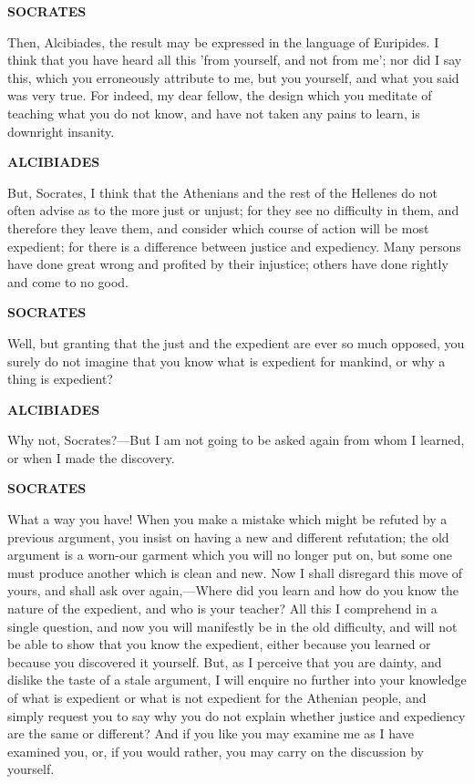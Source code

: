 \documentclass[11pt,letter]{article}
\begin{document}
\par \textbf{SOCRATES}
\par   Then, Alcibiades, the result may be expressed in the language of Euripides. I think that you have heard all this 'from yourself, and not from me'; nor did I say this, which you erroneously attribute to me, but you yourself, and what you said was very true. For indeed, my dear fellow, the design which you meditate of teaching what you do not know, and have not taken any pains to learn, is downright insanity.

\par \textbf{ALCIBIADES}
\par   But, Socrates, I think that the Athenians and the rest of the Hellenes do not often advise as to the more just or unjust; for they see no difficulty in them, and therefore they leave them, and consider which course of action will be most expedient; for there is a difference between justice and expediency. Many persons have done great wrong and profited by their injustice; others have done rightly and come to no good.

\par \textbf{SOCRATES}
\par   Well, but granting that the just and the expedient are ever so much opposed, you surely do not imagine that you know what is expedient for mankind, or why a thing is expedient?

\par \textbf{ALCIBIADES}
\par   Why not, Socrates?—But I am not going to be asked again from whom I learned, or when I made the discovery.

\par \textbf{SOCRATES}
\par   What a way you have! When you make a mistake which might be refuted by a previous argument, you insist on having a new and different refutation; the old argument is a worn-our garment which you will no longer put on, but some one must produce another which is clean and new. Now I shall disregard this move of yours, and shall ask over again,—Where did you learn and how do you know the nature of the expedient, and who is your teacher? All this I comprehend in a single question, and now you will manifestly be in the old difficulty, and will not be able to show that you know the expedient, either because you learned or because you discovered it yourself. But, as I perceive that you are dainty, and dislike the taste of a stale argument, I will enquire no further into your knowledge of what is expedient or what is not expedient for the Athenian people, and simply request you to say why you do not explain whether justice and expediency are the same or different? And if you like you may examine me as I have examined you, or, if you would rather, you may carry on the discussion by yourself.
\end{document}
